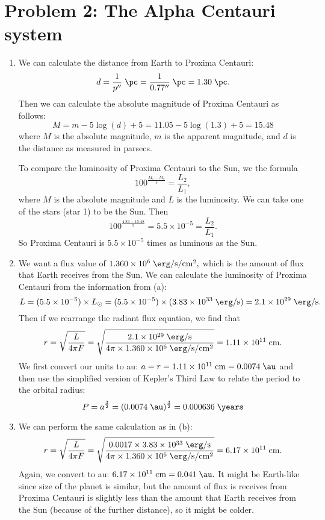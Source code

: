 \documentclass[11pt,letterpaper]{article}
\begin{document}
	\section*{Problem 2: The Alpha Centauri system}
	\begin{enumerate}[label=(\alph*)]
		\item 
		We can calculate the distance from Earth to Proxima Centauri: $$d=\frac{1}{p''}\;\si{\pc} = \frac{1}{0.77''}\;\si{\pc} = 1.30\;\si{\pc}.$$ 
		Then we can calculate the absolute magnitude of Proxima Centauri as follows: $$M = m - 5\log(d) + 5 = 11.05 - 5\log(1.3) + 5 = 15.48$$ where $M$ is the absolute magnitude, $m$ is the apparent magnitude, and $d$ is the distance as measured in parsecs. 
		
		To compare the luminosity of Proxima Centauri to the Sun, we the formula $$100^{\frac{M_1 - M_2}{5}} = \frac{L_2}{L_1}, $$ where $M$ is the absolute magnitude and $L$ is the luminosity. We can take one of the stars (star 1) to be the Sun. Then $$100^{\frac{4.83 - 15.48}{5}} = 5.5\times 10^{-5} =  \frac{L_2}{L_1}.$$ So Proxima Centauri is $5.5\times 10^{-5}$ times as luminous as the Sun.
		
		\item
		We want a flux value of $1.360 \times 10^6\;\si{\erg\per\second\per\square\cm},$ which is the amount of flux that Earth receives from the Sun. We can calculate the luminosity of Proxima Centauri from the information from (a): $$L = (5.5\times 10^{-5}) \times L_\odot = (5.5\times 10^{-5}) \times (3.83 \times 10^{33}\;\si{\erg\per\second}) = 2.1\times 10^{29}\;\si{\erg\per\second}.$$ Then if we rearrange the radiant flux equation, we find that $$r=\sqrt{\frac{L}{4\pi F}} = \sqrt{\frac{2.1\times 10^{29}\;\si{\erg\per\second}}{4\pi \times 1.360 \times 10^6\;\si{\erg\per\second\per\square\cm}}} = 1.11 \times 10^{11}\;\si{\cm}.$$ We first convert our units to au: $a = r = 1.11 \times 10^{11}\;\si{\cm} = 0.0074\;\si{\au}$ and then use the simplified version of Kepler's Third Law to relate the period to the orbital radius: $$P = a^{\frac{3}{2}} = (0.0074\;\si{\au})^{\frac{3}{2}} = 0.000636\;\si{\years}$$
		
		\item
		We can perform the same calculation as in (b): $$r=\sqrt{\frac{L}{4\pi F}} = \sqrt{\frac{0.0017 \times 3.83 \times 10^{33}\;\si{\erg\per\second}}{4\pi \times 1.360 \times 10^6\;\si{\erg\per\second\per\square\cm}}} = 6.17 \times 10^{11}\;\si{\cm}.$$ Again, we convert to au: $6.17 \times 10^{11}\;\si{\cm} = 0.041\;\si{\au}.$ It might be Earth-like since size of the planet is similar, but the amount of flux is receives from Proxima Centauri is slightly less than the amount that Earth receives from the Sun (because of the further distance), so it might be colder.
		

\end{enumerate}
\end{document}
